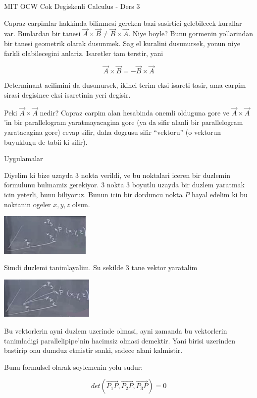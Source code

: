 \documentclass[12pt,fleqn]{article}
\begin{document}
MIT OCW Cok Degiskenli Calculus - Ders 3

Capraz carpimlar hakkinda bilinmesi gereken bazi sasirtici gelebilecek
kurallar var. Bunlardan bir tanesi $\vec{A} \times \vec{B} \ne \vec{B}
\times \vec{A}$. Niye boyle? Bunu 
gormenin yollarindan bir tanesi geometrik olarak dusunmek. Sag el kuralini
dusunursek, yonun niye farkli olabilecegini anlariz. Isaretler tam terstir, yani

\[  \vec{A} \times \vec{B} = - \vec{B}\times \vec{A} \]

Determinant acilimini da dusunursek, ikinci terim eksi isareti tasir, ama
carpim sirasi degisince eksi isaretinin yeri degisir. 

Peki $\vec{A} \times \vec{A}$ nedir? Capraz carpim alan hesabinda onemli
olduguna gore ve $\vec{A} \times \vec{A}$'in bir parallelogram
yaratmayacagina gore (ya da sifir alanli bir parallelogram yaratacagina
gore) cevap sifir, daha dogrusu sifir ``vektoru'' (o vektorun buyuklugu de
tabii ki sifir).

Uygulamalar

Diyelim ki bize uzayda 3 nokta verildi, ve bu noktalari iceren bir duzlemin
formulunu bulmamiz gerekiyor. 3 nokta 3 boyutlu uzayda bir duzlem yaratmak
icin yeterli, bunu biliyoruz. Bunun icin bir dorduncu nokta $P$ hayal
edelim ki bu noktanin ogeler $x,y,z$ olsun.

\includegraphics[height=2cm]{3_1.png}

Simdi duzlemi tanimlayalim. Su sekilde 3 tane vektor yaratalim

\includegraphics[height=2cm]{3_2.png}

Bu vektorlerin ayni duzlem uzerinde olmasi, ayni zamanda bu vektorlerin
tanimladigi parallelipipe'nin hacimsiz olmasi demektir. Yani birisi
uzerinden bastirip onu dumduz etmistir sanki, sadece alani kalmistir. 

Bunu formulsel olarak soylemenin yolu sudur:

\[ det(\vec{P_1P},\vec{P_2P},\vec{P_3P}) = 0 \]
\end{document}

